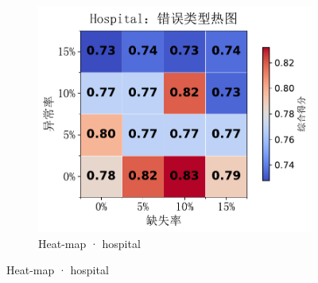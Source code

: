 \documentclass[10pt]{article} %
\numberwithin{equation}{section}
\begin{document}
\begin{figure}[htbp]
\begin{subfigure}{0.295\linewidth}
    \includegraphics[width=\linewidth]{figures/5.3.2graph/hospital_heatmap.pdf}
    \caption{Heat-map · hospital}
  \end{subfigure}


\end{figure}
\end{document}
